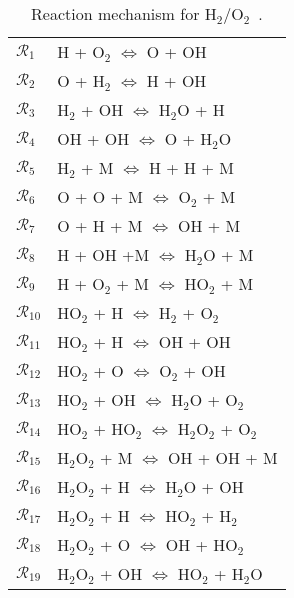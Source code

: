 \begin{table}[htbp]
\renewcommand*{\arraystretch}{1.2}
\begin{center}
\begin{tabular}{ll}
\toprule
$\mathcal{R}_1$ & H + O$_2$ $\Longleftrightarrow$ O + OH \\
$\mathcal{R}_2$ & O + H$_2$ $\Longleftrightarrow$ H + OH \\
$\mathcal{R}_3$ & H$_2$ + OH $\Longleftrightarrow$ H$_2$O + H \\
$\mathcal{R}_4$ & OH + OH $\Longleftrightarrow$ O + H$_2$O \\
$\mathcal{R}_5$ & H$_2$ + M $\Longleftrightarrow$ H + H + M \\
$\mathcal{R}_6$ & O + O + M $\Longleftrightarrow$ O$_2$ + M \\
$\mathcal{R}_7$ & O + H + M $\Longleftrightarrow$ OH + M \\
$\mathcal{R}_8$ & H + OH +M $\Longleftrightarrow$ H$_2$O + M \\
$\mathcal{R}_9$ & H + O$_2$ + M $\Longleftrightarrow$ HO$_2$ + M \\
$\mathcal{R}_{10}$ & HO$_2$ + H $\Longleftrightarrow$ H$_2$ + O$_2$ \\
$\mathcal{R}_{11}$ & HO$_2$ + H $\Longleftrightarrow$ OH + OH \\
$\mathcal{R}_{12}$ & HO$_2$ + O $\Longleftrightarrow$ O$_2$ + OH \\
$\mathcal{R}_{13}$ & HO$_2$ + OH $\Longleftrightarrow$ H$_2$O + O$_2$ \\
$\mathcal{R}_{14}$ & HO$_2$ + HO$_2$ $\Longleftrightarrow$ H$_2$O$_2$ + O$_2$ \\
$\mathcal{R}_{15}$ & H$_2$O$_2$ + M $\Longleftrightarrow$ OH + OH + M \\
$\mathcal{R}_{16}$ & H$_2$O$_2$ + H $\Longleftrightarrow$ H$_2$O + OH \\
$\mathcal{R}_{17}$ & H$_2$O$_2$ + H $\Longleftrightarrow$ HO$_2$ + H$_2$ \\
$\mathcal{R}_{18}$ & H$_2$O$_2$ + O $\Longleftrightarrow$ OH + HO$_2$ \\
$\mathcal{R}_{19}$ & H$_2$O$_2$ + OH $\Longleftrightarrow$ HO$_2$ + H$_2$O \\
\bottomrule
\end{tabular}
\end{center}

\caption{Reaction mechanism for H$_2$/O$_2$~\cite{Yetter:1991}.}
\label{tab:kinetics}
\end{table}

